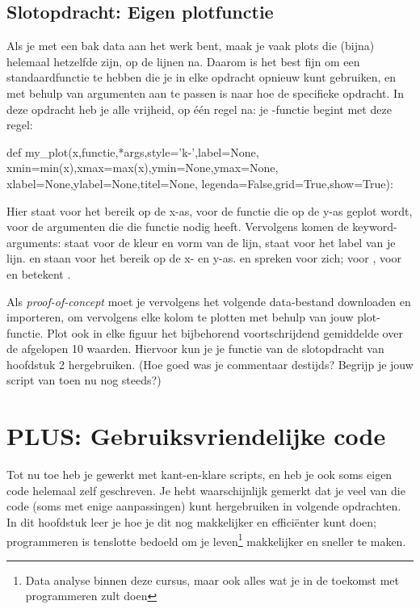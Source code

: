 \documentclass[a4paper,11pt, fleqn]{article}
\newcommand{\ditwc}{Naam van het huidige werkcollege}
\begin{document}
\subsection{Slotopdracht: Eigen plotfunctie}
Als je met een bak data aan het werk bent, maak je vaak plots die (bijna) helemaal hetzelfde zijn, op de lijnen na. Daarom is het best fijn om een standaardfunctie te hebben die je in elke opdracht opnieuw kunt gebruiken, en met behulp van argumenten aan te passen is naar hoe de specifieke opdracht. In deze opdracht heb je alle vrijheid, op \'e\'en regel na: je -functie begint met deze regel:

\begin{python}
def my_plot(x,functie,*args,style='k-',label=None,
	    xmin=min(x),xmax=max(x),ymin=None,ymax=None,
	    xlabel=None,ylabel=None,titel=None,
	    legenda=False,grid=True,show=True):
\end{python}
Hier staat  voor het bereik op de x-as,  voor de functie die op de y-as geplot wordt,  voor de argumenten die die functie nodig heeft. Vervolgens komen de keyword-arguments:  staat voor de kleur en vorm van de lijn,  staat voor het label van je lijn.  en  staan voor het bereik op de x- en y-as.  en  spreken voor zich;  voor ,  voor  en  betekent .

Als {\it proof-of-concept} moet je vervolgens het volgende data-bestand downloaden en importeren, om vervolgens elke kolom te plotten met behulp van jouw plot-functie. Plot ook in elke figuur het bijbehorend voortschrijdend gemiddelde over de afgelopen 10 waarden. Hiervoor kun je je functie van de slotopdracht van hoofdstuk 2 hergebruiken. (Hoe goed was je commentaar destijds? Begrijp je jouw script van toen nu nog steeds?)

\clearpage
\renewcommand{\ditwc}{PLUS: Gebruiksvriendelijke code}
\section[PLUS: Gebruiksvriendelijke code]{\ditwc}

Tot nu toe heb je gewerkt met kant-en-klare scripts, en heb je ook soms eigen code helemaal zelf geschreven. Je hebt waarschijnlijk gemerkt dat je veel van die code (soms met enige aanpassingen) kunt hergebruiken in volgende opdrachten. In dit hoofdstuk leer je hoe je dit nog makkelijker en effici\"enter kunt doen; programmeren is tenslotte bedoeld om je leven\footnote{Data analyse binnen deze cursus, maar ook alles wat je in de toekomst met programmeren zult doen} makkelijker en sneller te maken.
\end{document}
